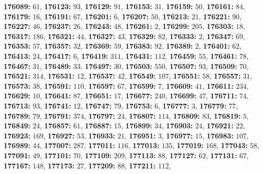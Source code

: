 \textsf{\bfseries 176089:} $61$, \textsf{\bfseries 176123:} $93$, \textsf{\bfseries 176129:} $91$, \textsf{\bfseries 176153:} $31$, \textsf{\bfseries 176159:} $50$, \textsf{\bfseries 176161:} $84$, \textsf{\bfseries 176179:} $16$, \textsf{\bfseries 176191:} $67$, \textsf{\bfseries 176201:} $6$, \textsf{\bfseries 176207:} $50$, \textsf{\bfseries 176213:} $21$, \textsf{\bfseries 176221:} $90$, \textsf{\bfseries 176227:} $46$, \textsf{\bfseries 176237:} $26$, \textsf{\bfseries 176243:} $48$, \textsf{\bfseries 176261:} $2$, \textsf{\bfseries 176299:} $205$, \textsf{\bfseries 176303:} $18$, \textsf{\bfseries 176317:} $186$, \textsf{\bfseries 176321:} $44$, \textsf{\bfseries 176327:} $43$, \textsf{\bfseries 176329:} $82$, \textsf{\bfseries 176333:} $2$, \textsf{\bfseries 176347:} $69$, \textsf{\bfseries 176353:} $57$, \textsf{\bfseries 176357:} $32$, \textsf{\bfseries 176369:} $59$, \textsf{\bfseries 176383:} $92$, \textsf{\bfseries 176389:} $2$, \textsf{\bfseries 176401:} $62$, \textsf{\bfseries 176413:} $24$, \textsf{\bfseries 176417:} $6$, \textsf{\bfseries 176419:} $311$, \textsf{\bfseries 176431:} $112$, \textsf{\bfseries 176459:} $55$, \textsf{\bfseries 176461:} $78$, \textsf{\bfseries 176467:} $31$, \textsf{\bfseries 176489:} $33$, \textsf{\bfseries 176497:} $30$, \textsf{\bfseries 176503:} $550$, \textsf{\bfseries 176507:} $93$, \textsf{\bfseries 176509:} $70$, \textsf{\bfseries 176521:} $314$, \textsf{\bfseries 176531:} $12$, \textsf{\bfseries 176537:} $42$, \textsf{\bfseries 176549:} $107$, \textsf{\bfseries 176551:} $58$, \textsf{\bfseries 176557:} $31$, \textsf{\bfseries 176573:} $38$, \textsf{\bfseries 176591:} $110$, \textsf{\bfseries 176597:} $67$, \textsf{\bfseries 176599:} $7$, \textsf{\bfseries 176609:} $41$, \textsf{\bfseries 176611:} $234$, \textsf{\bfseries 176629:} $10$, \textsf{\bfseries 176641:} $87$, \textsf{\bfseries 176651:} $17$, \textsf{\bfseries 176677:} $240$, \textsf{\bfseries 176699:} $47$, \textsf{\bfseries 176711:} $74$, \textsf{\bfseries 176713:} $93$, \textsf{\bfseries 176741:} $12$, \textsf{\bfseries 176747:} $79$, \textsf{\bfseries 176753:} $6$, \textsf{\bfseries 176777:} $3$, \textsf{\bfseries 176779:} $77$, \textsf{\bfseries 176789:} $79$, \textsf{\bfseries 176791:} $374$, \textsf{\bfseries 176797:} $24$, \textsf{\bfseries 176807:} $114$, \textsf{\bfseries 176809:} $83$, \textsf{\bfseries 176819:} $5$, \textsf{\bfseries 176849:} $24$, \textsf{\bfseries 176857:} $61$, \textsf{\bfseries 176887:} $15$, \textsf{\bfseries 176899:} $34$, \textsf{\bfseries 176903:} $24$, \textsf{\bfseries 176921:} $22$, \textsf{\bfseries 176923:} $169$, \textsf{\bfseries 176927:} $53$, \textsf{\bfseries 176933:} $21$, \textsf{\bfseries 176951:} $3$, \textsf{\bfseries 176977:} $15$, \textsf{\bfseries 176983:} $107$, \textsf{\bfseries 176989:} $44$, \textsf{\bfseries 177007:} $287$, \textsf{\bfseries 177011:} $116$, \textsf{\bfseries 177013:} $135$, \textsf{\bfseries 177019:} $168$, \textsf{\bfseries 177043:} $58$, \textsf{\bfseries 177091:} $49$, \textsf{\bfseries 177101:} $70$, \textsf{\bfseries 177109:} $209$, \textsf{\bfseries 177113:} $88$, \textsf{\bfseries 177127:} $62$, \textsf{\bfseries 177131:} $67$, \textsf{\bfseries 177167:} $148$, \textsf{\bfseries 177173:} $27$, \textsf{\bfseries 177209:} $88$, \textsf{\bfseries 177211:} $112$, 
